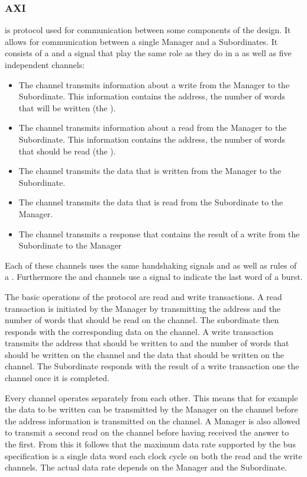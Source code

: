 \subsubsection{AXI}\label{sec:AXI}
\AXI{}\autocite{ref:axi} is protocol used for communication between some components of the \FPGA{} design. It allows for communication between a single Manager and a Subordinates. It consists of a \ACLK{} and a \ARESETn{} signal that play the same role as they do in a \AXIStream{} as well as five independent channels:
\begin{itemize}
  \item The \AW{} channel transmits information about a write from the Manager to the Subordinate. This information contains the address, the number of words that will be written (the \burstsize{}).
  \item The \AR{} channel transmits information about a read from the Manager to the Subordinate. This information contains the address, the number of words that should be read (the \burstsize{}).
  \item The \W{} channel transmits the data that is written from the Manager to the Subordinate.
  \item The \R{} channel transmits the data that is read from the Subordinate to the Manager.
  \item The \B{} channel transmits a response that contains the result of a write from the Subordinate to the Manager
\end{itemize}
Each of these channels uses the same handshaking signals \READY{} and \VALID{} as well as rules of a \AXIStream{}. Furthermore the \W{} and \R{} channels use a \LAST{} signal to indicate the last word of a burst.

The basic operations of the \AXI{} protocol are read and write transactions. A read transaction is initiated by the Manager by transmitting the address and the number of words that should be read on the \AR{} channel. The subordinate then responds with the corresponding data on the \R{} channel. A write transaction transmits the address that should be written to and the number of words that should be written on the \AW{} channel  and the data that should be written on the \W{} channel. The Subordinate responds with the result of a write transaction one the \B{} channel once it is completed.

Every channel operates separately from each other. This means that for example the data to be written can be transmitted by the Manager on the \W{} channel before the address information is transmitted on the \AW{} channel. A Manager is also allowed to transmit a second read on the \AR{} channel before having received the answer to the first.
From this it follows that the maximum data rate supported by the bus specification is a single data word each clock cycle on both the read and the write channels. The actual data rate depends on the Manager and the Subordinate.

